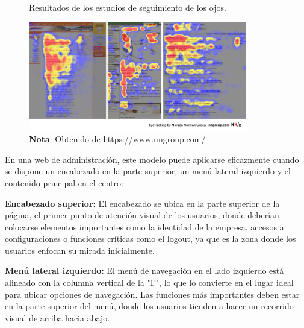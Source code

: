 		\begin{figure}[h] %
			\caption[Estudios de seguimiento ocular]
			{\newline Resultados de los estudios de seguimiento de los ojos.} %
			\vspace{0.3cm}
			\centering
			\includegraphics[width=0.85\textwidth]{imagenes/figura2_4.jpg} %
			\vspace{0.3cm}
			\caption*{\textup{\textbf{Nota}: Obtenido de https://www.nngroup.com/}}
			\vspace{-0.8cm}
			\label{fig:figura2_4} %
		\end{figure}
		
		En una web de administración, este modelo puede aplicarse eficazmente cuando se dispone un encabezado en la parte superior, un menú lateral izquierdo y el contenido principal en el centro:
		
		\textbf{Encabezado superior:} El encabezado se ubica en la parte superior de la página, el primer punto de atención visual de los usuarios, donde deberían colocarse elementos importantes como la identidad de la empresa, accesos a configuraciones o funciones críticas como el logout, ya que es la zona donde los usuarios enfocan su mirada inicialmente.
		
		\textbf{Menú lateral izquierdo:} El menú de navegación en el lado izquierdo está alineado con la columna vertical de la "F", lo que lo convierte en el lugar ideal para ubicar opciones de navegación. Las funciones más importantes deben estar en la parte superior del menú, donde los usuarios tienden a hacer un recorrido visual de arriba hacia abajo.
		
